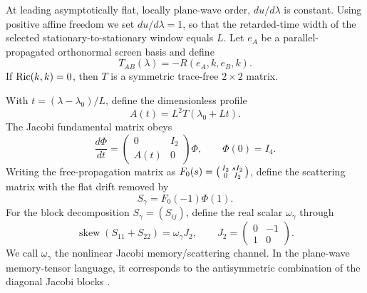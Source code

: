 At leading asymptotically flat, locally plane-wave order, $du/d\lambda$ is constant. Using positive affine freedom we set $du/d\lambda=1$, so that the retarded-time width of the selected stationary-to-stationary window equals $L$. Let $e_A$ be a parallel-propagated orthonormal screen basis and define
\begin{equation}
T_{AB}(\lambda)=-R(e_A,k,e_B,k).
\label{eq:tidal}
\end{equation}
If $\operatorname{Ric}(k,k)=0$, then $T$ is a symmetric trace-free $2\times2$ matrix.

With $t=(\lambda-\lambda_0)/L$, define the dimensionless profile
\[
A(t)=L^2T(\lambda_0+Lt).
\]
The Jacobi fundamental matrix obeys
\begin{equation}
\frac{d\Phi}{dt}=\begin{pmatrix}0&I_2\\ A(t)&0\end{pmatrix}\Phi,
\qquad \Phi(0)=I_4.
\label{eq:jacobi}
\end{equation}
Writing the free-propagation matrix as $F_0(s)=\begin{psmallmatrix}I_2&sI_2\\0&I_2\end{psmallmatrix}$, define the scattering matrix with the flat drift removed by
\begin{equation}
S_\gamma=F_0(-1)\Phi(1).
\label{eq:S}
\end{equation}
For the block decomposition $S_\gamma=(S_{ij})$, define the real scalar $\omega_\gamma$ through
\begin{equation}
\operatorname{skew}(S_{11}+S_{22})=\omega_\gamma J_2,
\qquad J_2=\begin{pmatrix}0&-1\\1&0\end{pmatrix}.
\label{eq:omega-def}
\end{equation}
We call $\omega_\gamma$ the nonlinear Jacobi memory/scattering channel. In the plane-wave memory-tensor language, it corresponds to the antisymmetric combination of the diagonal Jacobi blocks \cite{Flanagan2020,Harte2025}.

